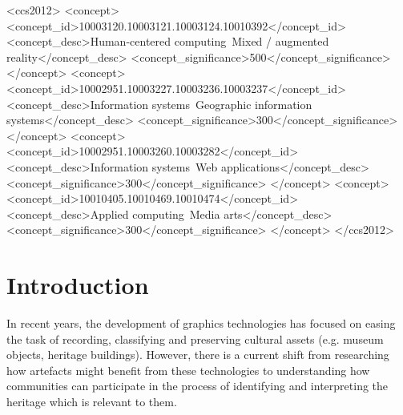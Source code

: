 \documentclass[acmlarge,screen,dvipsnames]{acmart}
\begin{document}
\begin{CCSXML} <ccs2012> <concept>
<concept_id>10003120.10003121.10003124.10010392</concept_id>
<concept_desc>Human-centered computing~Mixed / augmented
reality</concept_desc> <concept_significance>500</concept_significance>
</concept> <concept>
<concept_id>10002951.10003227.10003236.10003237</concept_id>
<concept_desc>Information systems~Geographic information
systems</concept_desc> <concept_significance>300</concept_significance>
</concept> <concept> <concept_id>10002951.10003260.10003282</concept_id>
<concept_desc>Information systems~Web applications</concept_desc>
<concept_significance>300</concept_significance> </concept> <concept>
<concept_id>10010405.10010469.10010474</concept_id> <concept_desc>Applied
computing~Media arts</concept_desc>
<concept_significance>300</concept_significance> </concept> </ccs2012>
\end{CCSXML}

  

\maketitle
\section{Introduction} In recent years, the development of graphics
technologies has focused on easing the task of recording, classifying and
preserving cultural assets (e.g. museum objects, heritage buildings). However,
there is a current shift from researching how artefacts might
benefit from these technologies to understanding how communities can
participate in the process of identifying and interpreting the heritage which is relevant to them. 


\end{document}
